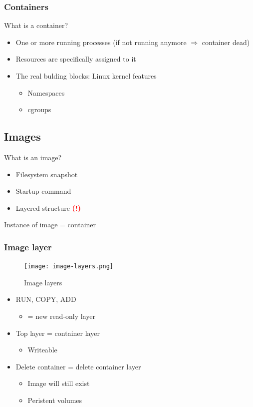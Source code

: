 \documentclass{article}
\newcommand{\bold}[1]{\textbf{#1}}
\begin{document}
\subsubsection{Containers}

What is a container?

\begin{itemize}
    \item One or more running processes (if not running anymore $\Rightarrow$ container dead)
    \item Resources are specifically assigned to it
    \item The real bulding blocks: Linux kernel features
    \begin{itemize}
        \item Namespaces
        \item cgroups
    \end{itemize}
\end{itemize}

\subsection{Images}

What is an image?

\begin{itemize}
    \item Filesystem snapshot
    \item Startup command
    \item Layered structure \bold{\textcolor{red}{(!)}}
\end{itemize}

Instance of image = container

\subsubsection{Image layer}

\begin{figure}[H]
    \centering
    \texttt{[image: image-layers.png]}
    \caption{Image layers}
\end{figure}

\begin{itemize}
    \item RUN, COPY, ADD
    \begin{itemize}
        \item = new read-only layer
    \end{itemize}
    \item Top layer = container layer
    \begin{itemize}
        \item Writeable
    \end{itemize}
    \item Delete container = delete container layer
    \begin{itemize}
        \item Image will still exist
        \item Peristent volumes
    \end{itemize}
\end{itemize}
\end{document}
